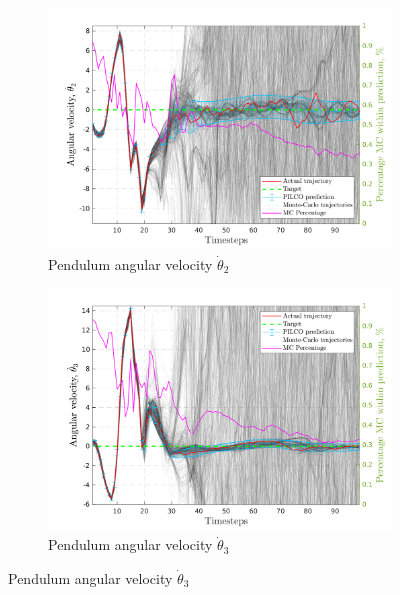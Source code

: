 \begin{figure}[htp!]
  \vspace{4ex}  %
  \begin{subfigure}[b]{0.48\linewidth}
    \centering
    \includegraphics[height=0.22\textheight,width=1\textwidth]{Chapter3/Figures/cdp_MC_rollout_Ep_75_Dim_3.png} 
    \caption{Pendulum angular velocity $\dot{\theta}_2$} 
    \label{Fig:Re-cdp-pen2-velocity} 
  \end{subfigure} 
  \hspace{\fill}
  \begin{subfigure}[b]{0.48\linewidth}
    \centering
    \includegraphics[height=0.22\textheight,width=1\textwidth]{Chapter3/Figures/cdp_MC_rollout_Ep_75_Dim_4.png} 
    \caption{Pendulum angular velocity $\dot{\theta}_3$} 
    \label{Fig:Re-cdp-pen3-velocity} 
  \end{subfigure} 


\end{figure}
